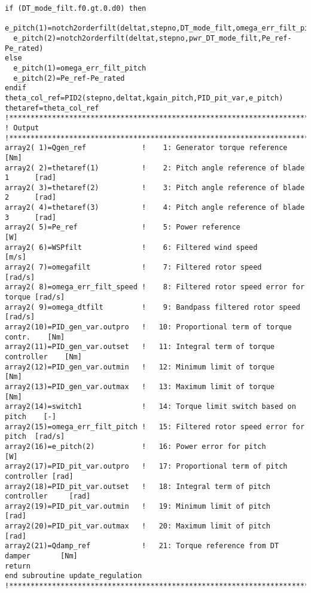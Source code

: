 {\begin{verbatim}
if (DT_mode_filt.f0.gt.0.d0) then
  e_pitch(1)=notch2orderfilt(deltat,stepno,DT_mode_filt,omega_err_filt_pitch)
  e_pitch(2)=notch2orderfilt(deltat,stepno,pwr_DT_mode_filt,Pe_ref-Pe_rated)
else
  e_pitch(1)=omega_err_filt_pitch
  e_pitch(2)=Pe_ref-Pe_rated
endif
theta_col_ref=PID2(stepno,deltat,kgain_pitch,PID_pit_var,e_pitch)
thetaref=theta_col_ref
!**************************************************************************************************
! Output
!**************************************************************************************************
array2( 1)=Qgen_ref             !    1: Generator torque reference            [Nm]
array2( 2)=thetaref(1)          !    2: Pitch angle reference of blade 1      [rad]
array2( 3)=thetaref(2)          !    3: Pitch angle reference of blade 2      [rad]
array2( 4)=thetaref(3)          !    4: Pitch angle reference of blade 3      [rad]
array2( 5)=Pe_ref               !    5: Power reference                       [W]
array2( 6)=WSPfilt              !    6: Filtered wind speed                   [m/s]
array2( 7)=omegafilt            !    7: Filtered rotor speed                  [rad/s]
array2( 8)=omega_err_filt_speed !    8: Filtered rotor speed error for torque [rad/s]
array2( 9)=omega_dtfilt         !    9: Bandpass filtered rotor speed         [rad/s]
array2(10)=PID_gen_var.outpro   !   10: Proportional term of torque contr.    [Nm]
array2(11)=PID_gen_var.outset   !   11: Integral term of torque controller    [Nm]
array2(12)=PID_gen_var.outmin   !   12: Minimum limit of torque               [Nm]
array2(13)=PID_gen_var.outmax   !   13: Maximum limit of torque               [Nm]
array2(14)=switch1              !   14: Torque limit switch based on pitch    [-]
array2(15)=omega_err_filt_pitch !   15: Filtered rotor speed error for pitch  [rad/s]
array2(16)=e_pitch(2)           !   16: Power error for pitch                 [W]
array2(17)=PID_pit_var.outpro   !   17: Proportional term of pitch controller [rad]
array2(18)=PID_pit_var.outset   !   18: Integral term of pitch controller     [rad]
array2(19)=PID_pit_var.outmin   !   19: Minimum limit of pitch                [rad]
array2(20)=PID_pit_var.outmax   !   20: Maximum limit of pitch                [rad]
array2(21)=Qdamp_ref            !   21: Torque reference from DT damper       [Nm]
return
end subroutine update_regulation
!**************************************************************************************************
\end{verbatim}
}

\pagebreak
